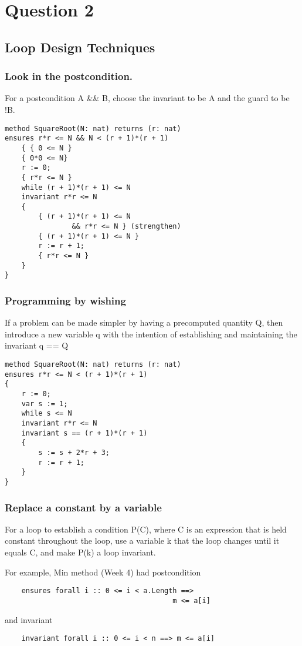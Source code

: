\section{Question 2}
\subsection{Loop Design Techniques}
\subsubsection{Look in the postcondition.}
For a postcondition A \&\& B,
choose the invariant to be A and the guard to be !B.
\begin{verbatim}
method SquareRoot(N: nat) returns (r: nat)
ensures r*r <= N && N < (r + 1)*(r + 1)
    { { 0 <= N }
    { 0*0 <= N}
    r := 0;
    { r*r <= N }
    while (r + 1)*(r + 1) <= N
    invariant r*r <= N
    {
        { (r + 1)*(r + 1) <= N 
                && r*r <= N } (strengthen)
        { (r + 1)*(r + 1) <= N }
        r := r + 1;
        { r*r <= N }
    }
}
\end{verbatim}

\subsubsection{Programming by wishing}
If a problem can be made simpler by having a
precomputed quantity Q, then introduce a new
variable q with the intention of establishing and
maintaining the invariant q == Q

\begin{verbatim}
method SquareRoot(N: nat) returns (r: nat)
ensures r*r <= N < (r + 1)*(r + 1)
{
    r := 0;
    var s := 1;
    while s <= N
    invariant r*r <= N
    invariant s == (r + 1)*(r + 1)
    {
        s := s + 2*r + 3;
        r := r + 1;
    }
}
\end{verbatim}

\subsubsection{Replace a constant by a variable}
For a loop to establish a condition P(C), where C is an
expression that is held constant throughout the loop,
use a variable k that the loop changes until it equals C,
and make P(k) a loop invariant.

For example, Min method (Week 4) had postcondition
\begin{verbatim}
    ensures forall i :: 0 <= i < a.Length ==>
                                        m <= a[i]
\end{verbatim}
and invariant
\begin{verbatim}
    invariant forall i :: 0 <= i < n ==> m <= a[i]
\end{verbatim}

